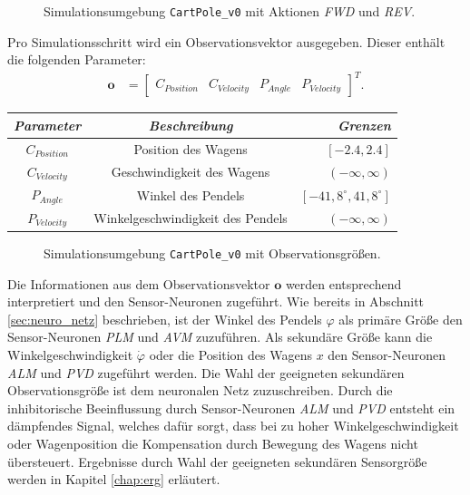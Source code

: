	\begin{figure}[H] %
		\centering
		\def\svgwidth{12cm}
		
		\caption{Simulationsumgebung \texttt{CartPole\_v0} mit Aktionen \textit{FWD} und \textit{REV}.}
		\label{fig:imp_cartpole_FWD_REV}
	\end{figure}
	Pro Simulationsschritt wird ein Observationsvektor ausgegeben. Dieser enthält die folgenden Parameter:
	\begin{align}
		\boldsymbol{o} &= \begin{bmatrix}C_{Position} & C_{Velocity} & P_{Angle} & P_{Velocity}\end{bmatrix}^T\text{.}
	\end{align}
	\begin{center}
		\begin{tabular}{c@{\hskip 0.5cm}c@{\hskip 0.5cm}r@{\hskip 0.5cm}}    \toprule
			\setlength{\tabcolsep}{50pt}
			\renewcommand{\arraystretch}{1.5}
			\emph{Parameter}	& \emph{Beschreibung}  				& \emph{Grenzen} 			\\\midrule
			$C_{Position}$		& Position des Wagens				& $[-2.4, 2.4]$				\\
			$C_{Velocity}$		& Geschwindigkeit des Wagens		& $(-\infty, \infty)$		\\
			$P_{Angle}$			& Winkel des Pendels				& $[-41,8^{\circ}, 41,8^{\circ}]$	\\
			$P_{Velocity}$		& Winkelgeschwindigkeit des Pendels	& $(-\infty, \infty)$		\\\bottomrule
			\hline
		\end{tabular}
	\end{center}
	\begin{figure}[!h] %
		\centering
		\def\svgwidth{12cm}
		
		\caption{Simulationsumgebung \texttt{CartPole\_v0} mit Observationsgrößen.}
		\label{fig:imp_cartpole_observation}
	\end{figure}
	Die Informationen aus dem Observationsvektor $\boldsymbol{o}$ werden entsprechend interpretiert und den Sensor-Neuronen zugeführt. Wie bereits in Abschnitt \ref{sec:neuro_netz} beschrieben, ist der Winkel des Pendels $\varphi$ als primäre Größe den Sensor-Neuronen \textit{PLM} und \textit{AVM} zuzuführen. Als sekundäre Größe kann die Winkelgeschwindigkeit $\dot{\varphi}$ oder die Position des Wagens $x$ den Sensor-Neuronen \textit{ALM} und \textit{PVD} zugeführt werden. Die Wahl der geeigneten sekundären Observationsgröße ist dem neuronalen Netz zuzuschreiben. Durch die inhibitorische Beeinflussung durch Sensor-Neuronen \textit{ALM} und \textit{PVD} entsteht ein dämpfendes Signal, welches dafür sorgt, dass bei zu hoher Winkelgeschwindigkeit oder Wagenposition die Kompensation durch Bewegung des Wagens nicht übersteuert. Ergebnisse durch Wahl der geeigneten sekundären Sensorgröße werden in Kapitel \ref{chap:erg} erläutert.


